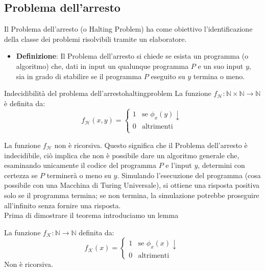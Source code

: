 \documentclass[12pt, a4paper]{report}
\begin{document}
                \subsection{Problema dell'arresto}
                    Il Problema dell'arresto (o Halting Problem) ha come obiettivo l'identificazione della classe dei problemi risolvibili tramite un elaboratore.
                    \begin{itemize}
                        \item \textbf{Definizione}: Il Problema dell'arresto si chiede se esista un programma (o algoritmo) che, dati in input un qualunque programma $P$ e un suo input $y$, sia in grado di stabilire se il programma $P$ eseguito su $y$ termina o meno.
                    \end{itemize}
                    \begin{theorembox}{Indecidibilità del problema dell'arresto}{haltingproblem}
                        La funzione $f_{\mathcal{H}}:\mathbb{N}\times\mathbb{N}\to\mathbb{N}$ è definita da:
                        $$
                        f_{\mathcal{H}}(x,y)=\begin{cases}
                            1 & \text{se }\phi_x(y)\downarrow\\
                            0 & \text{altrimenti}\\
                        \end{cases}
                        $$
                    \end{theorembox}
                    La funzione $f_{\mathcal{H}}$ non è ricorsiva. Questo significa che il Problema dell'arresto è indecidibile, ciò implica che non è possibile dare un algoritmo generale che, esaminando unicamente il codice del programma $P$ e l'input $y$, determini con certezza se $P$ terminerà o meno su $y$. Simulando l'esecuzione del programma (cosa possibile con una Macchina di Turing Universale), si ottiene una risposta positiva solo se il programma termina; se non termina, la simulazione potrebbe proseguire all'infinito senza fornire una risposta.\\
                    Prima di dimostrare il teorema introduciamo un lemma
                    \begin{lemma}{}{}
                        La funzione $f_\mathcal{K}:\mathbb{N}\to\mathbb{N}$ definita da:
                        $$f_\mathcal{K}(x)=\begin{cases}
                            1 & \text{se }\phi_x(x)\downarrow\\
                            0 & \text{altrimenti}
                        \end{cases}$$
                        Non è ricorsiva.
                    \end{lemma}
\end{document}
